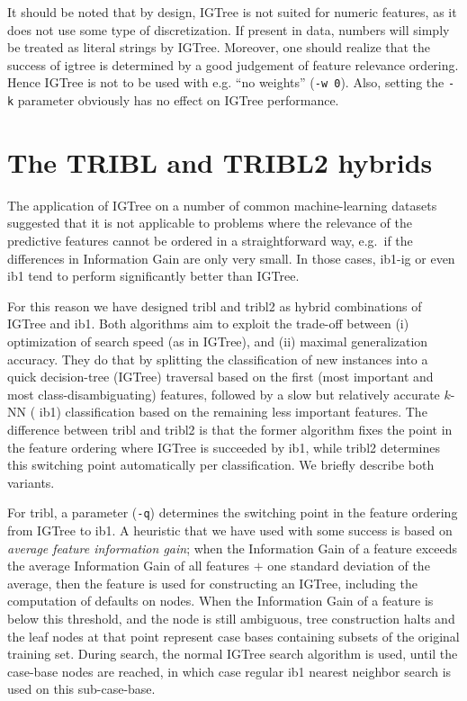 \documentclass{book}
\begin{document}
It should be noted that by design, {\sc IGTree} is not suited for
numeric features, as it does not use some type of discretization. If
present in data, numbers will simply be treated as literal strings by
{\sc IGTree}. Moreover, one should realize that the success of {\sc
  igtree} is determined by a good judgement of feature relevance
ordering. Hence {\sc IGTree} is not to be used with e.g. ``no
weights'' ({\tt -w 0}). Also, setting the {\tt -k} parameter obviously
has no effect on {\sc IGTree} performance.

\section{The TRIBL and TRIBL2 hybrids}
\label{tribl}

The application of {\sc IGTree} on a number of common machine-learning
datasets suggested that it is not applicable to problems where the
relevance of the predictive features cannot be ordered in a
straightforward way, e.g.~if the differences in Information Gain are
only very small. In those cases, {\sc ib1-ig} or even {\sc ib1} tend
to perform significantly better than {\sc IGTree}.

For this reason we have designed {\sc tribl} \cite{Daelemans+97d} and
{\sc tribl2} as hybrid combinations of {\sc IGTree} and {\sc
ib1}. Both algorithms aim to exploit the trade-off between (i)
optimization of search speed (as in {\sc IGTree}), and (ii) maximal
generalization accuracy. They do that by splitting the classification
of new instances into a quick decision-tree ({\sc IGTree}) traversal
based on the first (most important and most class-disambiguating)
features, followed by a slow but relatively accurate $k$-NN ({\sc
ib1}) classification based on the remaining less important
features. The difference between {\sc tribl} and {\sc tribl2} is that
the former algorithm fixes the point in the feature ordering where
{\sc IGTree} is succeeded by {\sc ib1}, while {\sc tribl2} determines
this switching point automatically per classification. We briefly
describe both variants.

For {\sc tribl}, a parameter ({\tt -q}) determines the switching point
in the feature ordering from {\sc IGTree} to {\sc ib1}. A heuristic
that we have used with some success is based on {\em average feature
information gain}; when the Information Gain of a feature exceeds the
average Information Gain of all features $+$ one standard
deviation of the average, then the feature is used for constructing an
{\sc IGTree}, including the computation of defaults on nodes. When the
Information Gain of a feature is below this threshold, and the node is
still ambiguous, tree construction halts and the leaf nodes at that
point represent case bases containing subsets of the original training
set. During search, the normal {\sc IGTree} search algorithm is used,
until the case-base nodes are reached, in which case regular {\sc ib1}
nearest neighbor search is used on this sub-case-base. 
\end{document}
